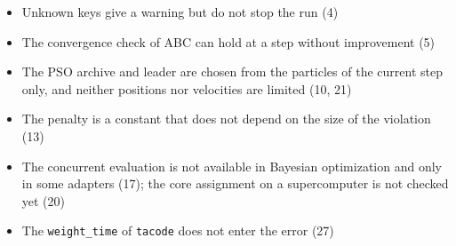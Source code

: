 \documentclass[11pt,a4paper]{article}
\begin{document}
\begin{itemize}
\item Unknown keys give a warning but do not stop the run (4)
\item The convergence check of ABC can hold at a step without improvement (5)
\item The PSO archive and leader are chosen from the particles of the current step only, and neither positions nor velocities are limited (10, 21)
\item The penalty is a constant that does not depend on the size of the violation (13)
\item The concurrent evaluation is not available in Bayesian optimization and only in some adapters (17); the core assignment on a supercomputer is not checked yet (20)
\item The \texttt{weight\_time} of \texttt{tacode} does not enter the error (27)
\end{itemize}
\end{document}
